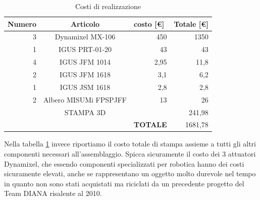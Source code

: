 \documentclass[%
corpo=11pt,
twoside,
 stile=classica,
oldstyle,
greek,%
]{toptesi}
\begin{document}
	\begin{table}[H]
		\centering
		\caption{Costi di realizzazione}
		\begin{tabular}{rrr|r|r|}
			\hline
			\multicolumn{1}{|l|}{\textbf{Numero}} & \multicolumn{2}{c|}{\textbf{Articolo}} & \multicolumn{1}{l|}{\textbf{costo [€]}} & \multicolumn{1}{l|}{\textbf{Totale [€]}} \bigstrut\\
			\hline
			\multicolumn{1}{|r|}{3} & \multicolumn{2}{c|}{Dynamixel MX-106} & 450   & 1350 \bigstrut\\
			\hline
			\multicolumn{1}{|r|}{1} & \multicolumn{2}{c|}{IGUS PRT-01-20} & 43    & 43 \bigstrut\\
			\hline
			\multicolumn{1}{|r|}{4} & \multicolumn{2}{c|}{IGUS JFM 1014} & 2,95  & 11,8 \bigstrut\\
			\hline
			\multicolumn{1}{|r|}{2} & \multicolumn{2}{c|}{IGUS JFM 1618} & 3,1   & 6,2 \bigstrut\\
			\hline
			\multicolumn{1}{|r|}{1} & \multicolumn{2}{c|}{IGUS JSM 1618} & 2,8   & 2,8 \bigstrut\\
			\hline
			\multicolumn{1}{|r|}{2} & \multicolumn{2}{c|}{Albero MISUMi FPSPJFF} & 13    & 26 \bigstrut\\
			\hline
			\multicolumn{1}{|r|}{} & \multicolumn{2}{c|}{STAMPA 3D} &       & 241,98 \bigstrut\\
			\hline
			&       &       & \textbf{TOTALE} & 1681,78 \bigstrut\\
			\cline{4-5}    \end{tabular}%
		\label{tab:projectcost}%
	\end{table}%
	Nella tabella \ref{tab:projectcost} invece riportiamo il costo totale di stampa assieme a tutti gli altri componenti necessari all'assemblaggio. Spicca sicuramente il costo dei 3 attuatori Dynamixel, che essendo componenti specializzati per robotica hanno dei costi sicuramente elevati, anche se rappresentano un oggetto molto durevole nel tempo in quanto non sono stati acquistati ma riciclati da un precedente progetto del Team DIANA risalente al 2010. 
\end{document}
